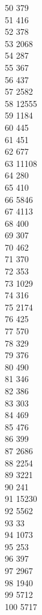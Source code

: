 { 50	379 \\
 51	416 \\
 52	378 \\
 53	2068 \\
 54	287 \\
 55	367 \\
 56	437 \\
 57	2582 \\
 58	12555 \\
 59	1184 \\
 60	445 \\
 61	451 \\
 62	677 \\
 63	11108 \\
 64	280 \\
 65	410 \\
 66	5846 \\
 67	4113 \\
 68	400 \\
 69	307 \\
 70	462 \\
 71	370 \\
 72	353 \\
 73	1029 \\
 74	316 \\
 75	2174 \\
 76	425 \\
 77	570 \\
 78	329 \\
 79	376 \\
 80	490 \\
 81	346 \\
 82	386 \\
 83	303 \\
 84	469 \\
 85	476 \\
 86	399 \\
 87	2686 \\
 88	2254 \\
 89	3221 \\
 90	241 \\
 91	15230 \\
 92	5562 \\
 93	33 \\
 94	1073 \\
 95	253 \\
 96	397 \\
 97	2967 \\
 98	1940 \\
 99	5712 \\
 100	5717 \\
}
